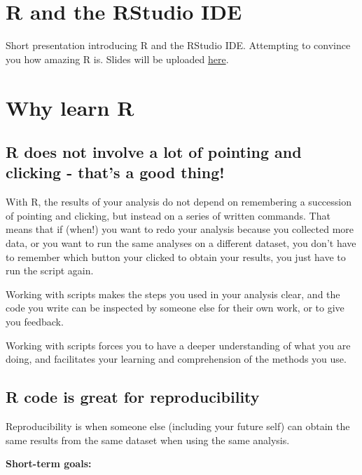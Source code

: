 \documentclass[
]{book}
\begin{document}
\section{R and the RStudio IDE}\label{r-and-the-rstudio-ide}

Short presentation introducing R and the RStudio IDE. Attempting to convince you how amazing R is. Slides will be uploaded \href{intro.pdf}{here}.

\section{Why learn R}\label{why-learn-r}

\subsection*{R does not involve a lot of pointing and clicking - that's a good thing!}\label{r-does-not-involve-a-lot-of-pointing-and-clicking---thats-a-good-thing}

With R, the results of your analysis do not depend on remembering a succession of pointing and clicking, but instead on a series of written commands. That means that if (when!) you want to redo your analysis because you collected more data, or you want to run the same analyses on a different dataset, you don't have to remember which button your clicked to obtain your results, you just have to run the script again.

Working with scripts makes the steps you used in your analysis clear, and the code you write can be inspected by someone else for their own work, or to give you feedback.

Working with scripts forces you to have a deeper understanding of what you are doing, and facilitates your learning and comprehension of the methods you use.

\subsection*{R code is great for reproducibility}\label{r-code-is-great-for-reproducibility}

Reproducibility is when someone else (including your future self) can obtain the same results from the same dataset when using the same analysis.

\textbf{Short-term goals:}
\end{document}
